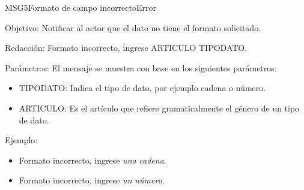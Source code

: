 \begin{mensaje}{MSG5}{Formato de campo incorrecto}{Error}
	\item [Objetivo:] Notificar al actor que el dato no tiene el formato solicitado.
	\item[Redacción:] Formato incorrecto, ingrese ARTICULO TIPODATO.
	\item[Parámetros:] El mensaje se muestra con base en los siguientes parámetros:
		\begin{itemize}
 			\item TIPODATO: Indica el tipo de dato, por ejemplo cadena o número.
 			\item ARTICULO: Es el artículo que refiere gramaticalmente el género de un tipo de dato.
		\end{itemize}
	\item[Ejemplo:] \begin{itemize}
		\item Formato incorrecto, ingrese {\em una} {\em cadena}.
		\item Formato incorrecto, ingrese {\em un} {\em número}.
	\end{itemize}
\end{mensaje}